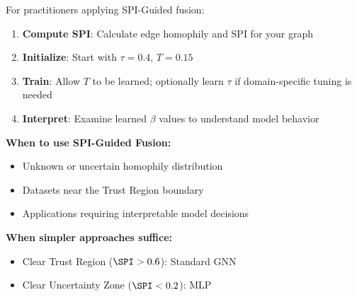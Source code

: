 For practitioners applying SPI-Guided fusion:

\begin{enumerate}
    \item \textbf{Compute SPI}: Calculate edge homophily and SPI for your graph
    \item \textbf{Initialize}: Start with $\tau=0.4$, $T=0.15$
    \item \textbf{Train}: Allow $T$ to be learned; optionally learn $\tau$ if domain-specific tuning is needed
    \item \textbf{Interpret}: Examine learned $\beta$ values to understand model behavior
\end{enumerate}

\textbf{When to use SPI-Guided Fusion:}
\begin{itemize}
    \item Unknown or uncertain homophily distribution
    \item Datasets near the Trust Region boundary
    \item Applications requiring interpretable model decisions
\end{itemize}

\textbf{When simpler approaches suffice:}
\begin{itemize}
    \item Clear Trust Region ($\SPI > 0.6$): Standard GNN
    \item Clear Uncertainty Zone ($\SPI < 0.2$): MLP
\end{itemize}
